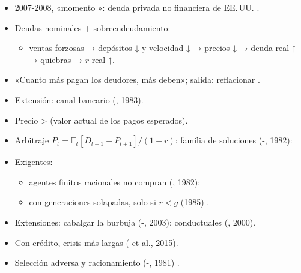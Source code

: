 \documentclass{article}
\begin{document}
\begin{columnas}
\begin{itemize}
\begin{itemize}
  \item la estabilidad es desestabilizadora.
  \end{itemize}
\item 2007-2008, «momento »: deuda privada no financiera de EE.\,UU. .
\end{itemize}
\begin{itemize}
\item Deudas nominales + sobreendeudamiento:
  \begin{itemize}
  \item ventas forzosas → depósitos ↓ y velocidad ↓ → precios ↓ → deuda real ↑ → quiebras → $r$ real ↑.
  \end{itemize}
\item «Cuanto más pagan los deudores, más deben»; salida: reflacionar .
\item Extensión: canal bancario (, 1983).
\end{itemize}
\begin{itemize}
\item Precio >  (valor actual de los pagos esperados).
\item Arbitraje $P_t=\mathbb{E}_t[D_{t+1}+P_{t+1}]/(1+r)$: familia de soluciones (-, 1982):
\item Exigentes:
  \begin{itemize}
  \item agentes finitos racionales no compran (, 1982);
  \item con generaciones solapadas, solo si $r<g$ (1985) .
  \end{itemize}
\item Extensiones: cabalgar la burbuja (-, 2003); conductuales (, 2000).
\item Con crédito, crisis más largas ( et al., 2015).
\end{itemize}
\begin{itemize}
\item Selección adversa y racionamiento (-, 1981) .

\end{itemize}
\end{columnas}
\end{document}
